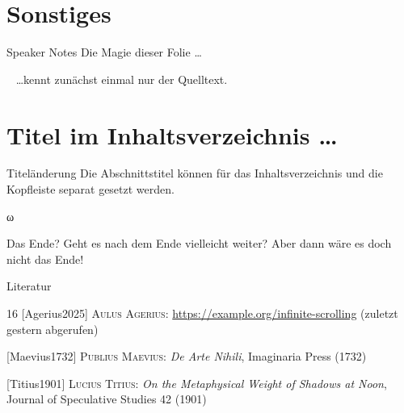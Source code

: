 \section{Sonstiges}

\begin{frame}{Speaker Notes}{}
  Die Magie dieser Folie \ldots
  \par{}~\pause%
  \ldots kennt zunächst einmal nur der Quelltext.
\end{frame}

\section[\ldots Titel in der Kopfleiste]{Titel im Inhaltsverzeichnis \ldots}

\begin{frame}{Titeländerung}{}
  Die Abschnittstitel können für das Inhaltsverzeichnis und die Kopfleiste separat gesetzt werden.
\end{frame}


\begin{standoutframe}
  \begin{center}
    {\color{accentcolor}\fontsize{60}{60}\selectfont ω}
  \end{center}
\end{standoutframe}

\appendix

\begin{frame}{Das Ende?}
  Geht es nach dem Ende vielleicht weiter? Aber dann wäre es doch nicht das Ende!
\end{frame}

\begin{frame}{Literatur}
  \begin{thebibliography}{16}
    [Agerius2025] \textsc{Aulus Agerius}: \url{https://example.org/infinite-scrolling} (zuletzt gestern abgerufen)

    [Maevius1732] \textsc{Publius Maevius}: \textit{De Arte Nihili}, Imaginaria Press (1732)

    [Titius1901] \textsc{Lucius Titius}: \textit{On the Metaphysical Weight of Shadows at Noon}, Journal of Speculative Studies 42 (1901)
  \end{thebibliography}
\end{frame}
